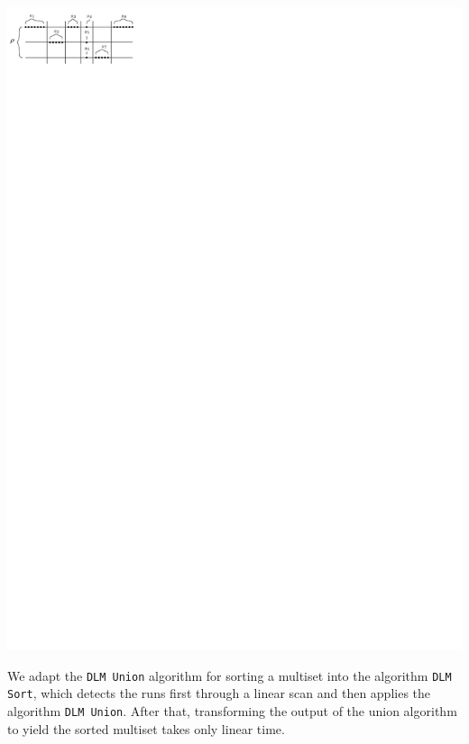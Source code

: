 \begin{minipage}[c]{.45\textwidth}
  \centering
  \includegraphics[scale=1.2]{union_instance1}
\end{minipage}\hfill
\begin{minipage}[c]{.45\textwidth}
  \label{fig:instance}
\end{minipage}

We adapt the \texttt{DLM Union} algorithm for sorting a multiset into
the algorithm \texttt{DLM Sort}, which detects the runs first through
a linear scan and then applies the algorithm \texttt{DLM Union}. After
that, transforming the output of the union algorithm to yield the
sorted multiset takes only linear time.

